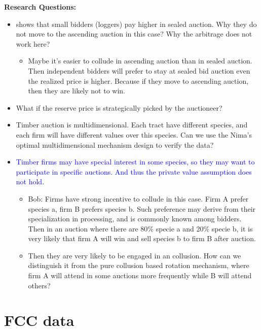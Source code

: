 \documentclass{book}
\theoremstyle{plain}
\theoremstyle{definition}
\begin{document}
\vspace{1em}
\noindent
\textbf{Research Questions:}
\begin{itemize}
	\item \cite{Athey:2011cs} shows that small bidders (loggers) pay higher in sealed auction. Why they do not move to the ascending auction in this case? Why the arbitrage does not work here?
	\begin{itemize}
		\item Maybe it's easier to collude in ascending auction than in sealed auction. Then independent bidders will prefer to stay at sealed bid auction even the realized price is higher. Because if they move to ascending auction, then they are likely not to win.
	\end{itemize}

	\item What if the reserve price is strategically picked by the auctioneer?

	\item Timber auction is multidimensional. Each tract have different species, and each firm will have different values over this species. Can we use the Nima's optimal multidimensional mechanism design to verify the data?

	\item \textcolor{blue}{Timber firms may have special interest in some species, so they may want to participate in specific auctions. And thus the private value assumption does not hold.}
	\begin{itemize}
		\item Bob: Firms have strong incentive to collude in this case. Firm A prefer species a, firm B prefers species b. Such preference may derive from their specialization in processing, and is commonly known among bidders. Then in an auction where there are 80\% specie a and 20\% specie b, it is very likely that firm A will win and sell species b to firm B after auction.
		
		\item Then they are very likely to be engaged in an collusion. How can we distinguish it from the pure collusion based rotation mechanism, where firm A will attend in some auctions more frequently while B will attend others?
	\end{itemize}
\end{itemize}

\section{FCC data} %
\label{sec:fcc_data}
\end{document}
